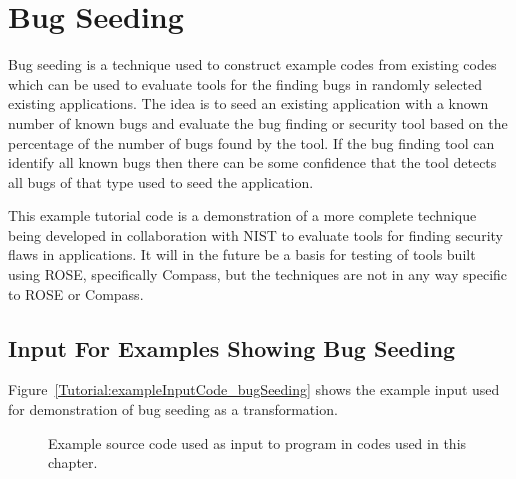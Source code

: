 \chapter{Bug Seeding}

  Bug seeding is a technique used to construct example codes from 
existing codes which can be used to evaluate tools for the finding
bugs in randomly selected existing applications.  The idea is to
seed an existing application with a known number of known bugs
and evaluate the bug finding or security tool based on the
percentage of the number of bugs found by the tool.  If the
bug finding tool can identify all known bugs then there can
be some confidence that the tool detects all bugs of that type
used to seed the application.

   This example tutorial code is a demonstration of a more
complete technique being developed in collaboration with NIST 
to evaluate tools for finding security flaws in applications.
It will in the future be a basis for testing of tools built using
ROSE, specifically Compass, but the techniques are not in any
way specific to ROSE or Compass.

\section{Input For Examples Showing Bug Seeding}

   Figure~\ref{Tutorial:exampleInputCode_bugSeeding}
shows the example input used for demonstration of bug seeding as 
a transformation.

\begin{figure}[!h]
{\indent
{\mySmallFontSize

\begin{latexonly}
   
\end{latexonly}

\begin{htmlonly}
   
\end{htmlonly}

}
}
\caption{Example source code used as input to program in
         codes used in this chapter.}
\label{Tutorial:exampleInputCode_seedBugs}
\end{figure}


